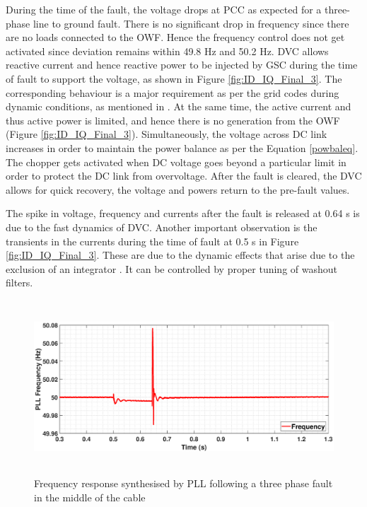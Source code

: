 During the time of the fault, the voltage drops at \gls{PCC} as expected for a three-phase line to ground fault. There is no significant drop in frequency since there are no loads connected to the \gls{OWF}. Hence the frequency control does not get activated since deviation remains within 49.8 Hz and 50.2 Hz.
\gls{DVC} allows reactive current and hence reactive power to be injected by \gls{GSC} during the time of fault to support the voltage, as shown in Figure \ref{fig:ID_IQ_Final_3}. The corresponding behaviour is a major requirement as per the grid codes during dynamic conditions, as mentioned in \cite{mohseni_review_2012}. At the same time, the active current and thus active power is limited, and hence there is no generation from the \gls{OWF} (Figure \ref{fig:ID_IQ_Final_3}). Simultaneously, the voltage across \gls{DC} link increases in order to maintain the power balance as per the Equation \ref{powbaleq}. The chopper gets activated when \gls{DC} voltage goes beyond a particular limit in order to protect the \gls{DC} link from overvoltage. After the fault is cleared, the \gls{DVC} allows for quick recovery, the voltage and powers return to the pre-fault values. 

The spike in voltage, frequency and currents after the fault is released at 0.64 s is due to the fast dynamics of \gls{DVC}. Another important observation is the transients in the currents during the time of fault at 0.5 s in Figure \ref{fig:ID_IQ_Final_3}. These are due to the dynamic effects that arise due to the exclusion of an integrator \cite{korai_dynamic_2019}. It can be controlled by proper tuning of washout filters.

\begin{figure}[H]
    \includegraphics[height = 6.5cm,width = \textwidth]{Diagrams/Chapter_3/Hz_RSCAD.eps}
    \caption{Frequency response synthesised by PLL following a three phase fault in the middle of the cable}
    \label{fig:Freq_3phaseSC}
\end{figure}

